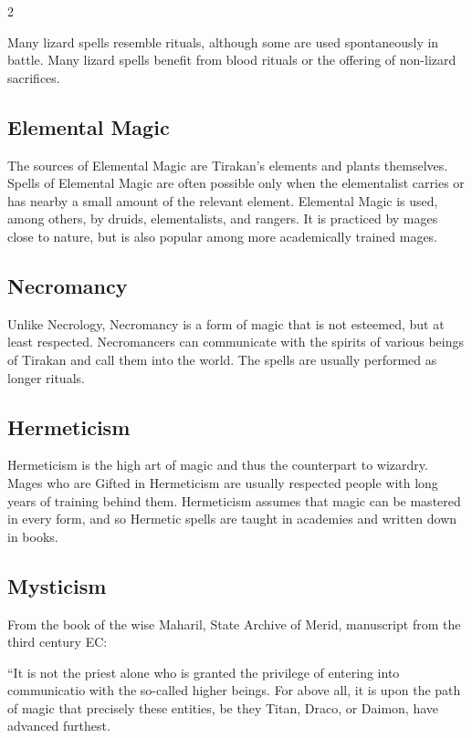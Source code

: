 \begin{multicols}{2}
{Many lizard spells resemble rituals, although some are used spontaneously in battle. Many lizard spells benefit from blood rituals or the offering of non-lizard sacrifices.

\subsection{Elemental Magic}\label{subsec:elementarmagie}

The sources of Elemental Magic are Tirakan's elements and plants themselves. Spells of Elemental Magic are often possible only when the elementalist carries or has nearby a small amount of the relevant element. Elemental Magic is used, among others, by druids, elementalists, and rangers. It is practiced by mages close to nature, but is also popular among more academically trained mages.

\subsection{Necromancy}\label{subsec:geisterbeschworungen}

Unlike Necrology, Necromancy is a form of magic that is not esteemed, but at least respected. Necromancers can communicate with the spirits of various beings of Tirakan and call them into the world. The spells are usually performed as longer rituals.

\subsection{Hermeticism}\label{subsec:hermetik}

Hermeticism is the high art of magic and thus the counterpart to wizardry. Mages who are Gifted in Hermeticism are usually respected people with long years of training behind them. Hermeticism assumes that magic can be mastered in every form, and so Hermetic spells are taught in academies and written down in books.

\subsection{Mysticism}
From the book of the wise Maharil, State Archive of Merid, manuscript from the third century EC:

``It is not the priest alone who is granted the privilege of entering into communicatio with the so-called higher beings. For above all, it is upon the path of magic that precisely these entities, be they Titan, Draco, or Daimon, have advanced furthest.

}
\end{multicols}
